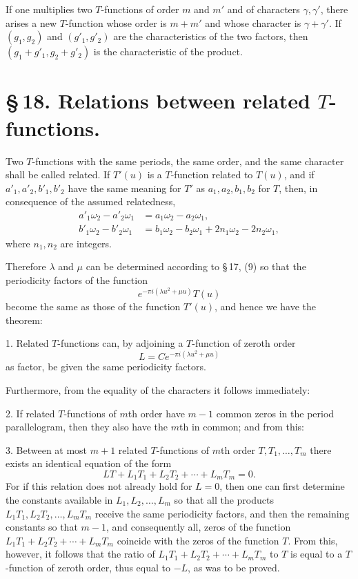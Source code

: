 \documentclass[11pt]{article}
\begin{document}
If one multiplies two $T$-functions of order $m$ and $m'$ and of characters $\gamma,\gamma'$, there arises a new $T$-function whose order is $m+m'$ and whose character is $\gamma+\gamma'$. If $(g_1,g_2)$ and $(g'_1,g'_2)$ are the characteristics of the two factors, then $(g_1+g'_1,g_2+g'_2)$ is the characteristic of the product.

\section*{\S\,18. Relations between related $T$-functions.}

Two $T$-functions with the same periods, the same order, and the same character shall be called related. If $T'(u)$ is a $T$-function related to $T(u)$, and if $a'_1,a'_2,b'_1,b'_2$ have the same meaning for $T'$ as $a_1,a_2,b_1,b_2$ for $T$, then, in consequence of the assumed relatedness,
\begin{align}
a'_1\omega_2-a'_2\omega_1&=a_1\omega_2-a_2\omega_1,\tag{1}\\
b'_1\omega_2-b'_2\omega_1&=b_1\omega_2-b_2\omega_1+2n_1\omega_2-2n_2\omega_1,\tag{2}
\end{align}
where $n_1,n_2$ are integers.

Therefore $\lambda$ and $\mu$ can be determined according to \S\,17, (9) so that the periodicity factors of the function
\[
e^{-\pi i(\lambda u^2+\mu u)}T(u)
\]
become the same as those of the function $T'(u)$, and hence we have the theorem:

1. Related $T$-functions can, by adjoining a $T$-function of zeroth order
\[
L=Ce^{-\pi i(\lambda u^2+\mu u)}
\]
as factor, be given the same periodicity factors.

Furthermore, from the equality of the characters it follows immediately:

2. If related $T$-functions of $m$th order have $m-1$ common zeros in the period parallelogram, then they also have the $m$th in common; and from this:

3. Between at most $m+1$ related $T$-functions of $m$th order $T,T_1,\ldots,T_m$ there exists an identical equation of the form
\[
LT+L_1T_1+L_2T_2+\cdots+L_mT_m=0.
\]
For if this relation does not already hold for $L=0$, then one can first determine the constants available in $L_1,L_2,\ldots,L_m$ so that all the products $L_1T_1,L_2T_2,\ldots,L_mT_m$ receive the same periodicity factors, and then the remaining constants so that $m-1$, and consequently all, zeros of the function $L_1T_1+L_2T_2+\cdots+L_mT_m$ coincide with the zeros of the function $T$. From this, however, it follows that the ratio of $L_1T_1+L_2T_2+\cdots+L_mT_m$ to $T$ is equal to a $T$-function of zeroth order, thus equal to $-L$, as was to be proved.
\end{document}
